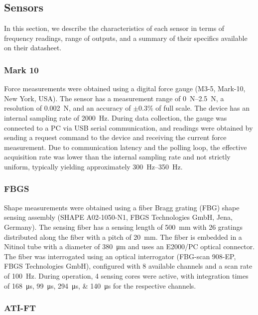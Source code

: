\documentclass[14pt, a4paper]{article}
\begin{document}
\subsection{Sensors}
In this section, we describe the characteristics of each sensor in terms of frequency readings, range of outputs, and a summary of their specifics available on their datasheet.
\subsubsection{Mark 10}

Force measurements were obtained using a digital force gauge (M3-5, Mark-10, New York, USA). 
The sensor has a measurement range of \SIrange{0}{2.5}{\newton}, a resolution of \SI{0.002}{\newton}, 
and an accuracy of $\pm 0.3\%$ of full scale. The device has an internal sampling rate of 
\SI{2000}{\hertz}. During data collection, the gauge was connected to a PC via USB serial 
communication, and readings were obtained by sending a request command to the device and 
receiving the current force measurement. Due to communication latency and the polling loop, 
the effective acquisition rate was lower than the internal sampling rate and not strictly 
uniform, typically yielding approximately \SIrange{300}{350}{\hertz}.

\subsubsection{FBGS}


Shape measurements were obtained using a fiber Bragg grating (FBG) shape sensing assembly 
(SHAPE A02-1050-N1, FBGS Technologies GmbH, Jena, Germany). The sensing fiber has a 
sensing length of \SI{500}{\milli\meter} with \num{26} gratings distributed along the fiber 
with a pitch of \SI{20}{\milli\meter}. The fiber is embedded in a Nitinol tube with a 
diameter of \SI{380}{\micro\meter} and uses an E2000/PC optical connector. 
The fiber was interrogated using an optical interrogator (FBG-scan 908-EP, FBGS Technologies GmbH), 
configured with \num{8} available channels and a scan rate of \SI{100}{\hertz}. During operation, \num{4} sensing cores were active, 
with integration times of \SIlist{168;99;294;140}{\micro\second} for the respective channels.

\subsubsection{ATI-FT}
\end{document}
